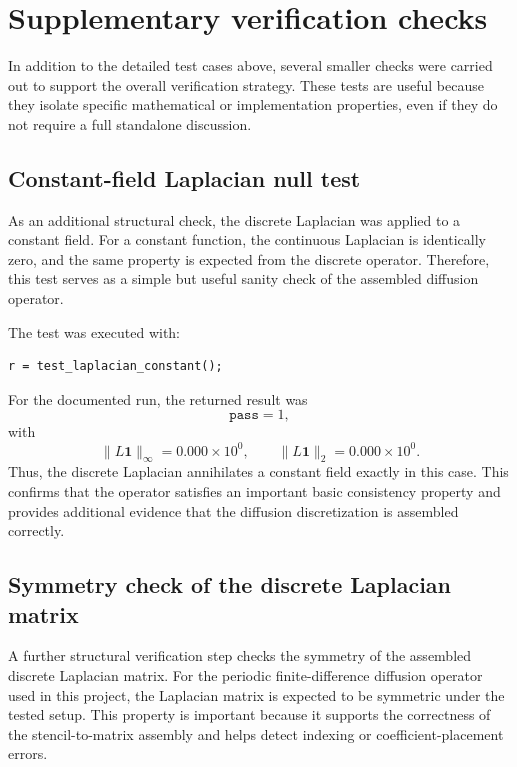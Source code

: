 \section{Supplementary verification checks}
\label{sec:verification_supplementary}

In addition to the detailed test cases above, several smaller checks were carried out to support the overall verification strategy. These tests are useful because they isolate specific mathematical or implementation properties, even if they do not require a full standalone discussion.

\subsection{Constant-field Laplacian null test}
\label{sec:verification_constant_field}

As an additional structural check, the discrete Laplacian was applied to a constant field. For a constant function, the continuous Laplacian is identically zero, and the same property is expected from the discrete operator. Therefore, this test serves as a simple but useful sanity check of the assembled diffusion operator.

The test was executed with:
\begin{verbatim}
r = test_laplacian_constant();
\end{verbatim}

For the documented run, the returned result was
\[
\texttt{pass} = 1,
\]
with
\[
\|L\mathbf{1}\|_{\infty} = 0.000\times 10^{0},
\qquad
\|L\mathbf{1}\|_{2} = 0.000\times 10^{0}.
\]
Thus, the discrete Laplacian annihilates a constant field exactly in this case. This confirms that the operator satisfies an important basic consistency property and provides additional evidence that the diffusion discretization is assembled correctly.

\subsection{Symmetry check of the discrete Laplacian matrix}
\label{sec:verification_laplacian_symmetry}

A further structural verification step checks the symmetry of the assembled discrete Laplacian matrix. For the periodic finite-difference diffusion operator used in this project, the Laplacian matrix is expected to be symmetric under the tested setup. This property is important because it supports the correctness of the stencil-to-matrix assembly and helps detect indexing or coefficient-placement errors.

